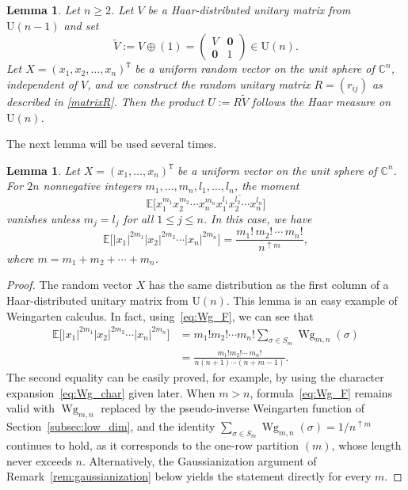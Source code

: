 \documentclass[pdftex]{sigma}
\numberwithin{equation}{section}
\newtheorem{Lemma}[Theorem]{Lemma}
\theoremstyle{definition}
\newcommand{\UU}{\mathrm{U}}
\newcommand{\trans}[1]{#1^{\mathtt{T}}}
\DeclareMathOperator{\Wg}{Wg}
\begin{document}
\begin{Lemma}
\label{lem:BNN}
Let $n \ge 2$. Let $V$ be a Haar-distributed unitary matrix from $\UU (n-1)$ and set
\begin{equation*} %
\tilde{V}:= V \oplus (1)=\begin{pmatrix} V & \bm{0} \\ \bm{0} & 1 \end {pmatrix} \in \UU(n).
\end{equation*}
Let $X=\trans{(x_1,x_2,\dots,x_n)}$ be a uniform random vector on the unit sphere of $\mathbb{C}^n$, independent of $V$,
and we construct the random unitary matrix $R=(r_{ij})$ as described in \eqref{matrixR}.
Then the product $U:=R \tilde{V}$ follows the Haar measure on $\UU (n)$.
\end{Lemma}


The next lemma will be used several times.

\begin{Lemma} \label{lem:Wg_for_R}
Let $X=\trans{(x_1,\dots,x_n)}$ be a uniform vector on the unit sphere of $\mathbb{C}^n$.
For $2n$ nonnegative integers $m_1,\dots, m_n, l_1,\dots, l_n$, the moment
\[
\mathbb{E}\bigl[x_1^{m_1} x_2^{m_2} \cdots x_n^{m_n} \overline{x_1^{l_1} x_2^{l_2} \cdots x_n^{l_n}} \bigr]
\]
 vanishes unless $m_j=l_j$ for all $1 \le j \le n$.
In this case, we have
\[
\mathbb{E} \bigl[|x_1|^{2m_1} |x_2|^{2m_2} \cdots |x_n|^{2m_n}\bigr]
= \frac{m_1! \, m_2! \, \cdots \, m_n!}{n^{\uparrow m}},
\]
where $m=m_1+ m_2+ \cdots+m_n$.
\end{Lemma}

\begin{proof}
The random vector $X$ has the same distribution as
the first column of a Haar-distributed unitary matrix from $\UU(n)$.
This lemma is an easy example of Weingarten calculus.
In fact, using~\eqref{eq:Wg_F}, we can see that
\begin{align*}
\mathbb{E} \bigl[|x_1|^{2m_1} |x_2|^{2m_2} \cdots |x_n|^{2m_n}\bigr]
&=m_1! m_2! \cdots m_n! \sum_{\sigma \in S_m} \Wg_{m,n}(\sigma) \\
&= \frac{m_1! m_2! \cdots \, m_n!}{n(n+1) \cdots (n+m-1)}.
\end{align*}
The second equality can be easily proved, for example, by using the character expansion~\eqref{eq:Wg_char} given later.
When $m > n$, formula~\eqref{eq:Wg_F} remains valid with $\Wg_{m,n}$ replaced by the pseudo-inverse Weingarten function of Section~\ref{subsec:low_dim}, and the identity $\sum_{\sigma \in S_m} \Wg_{m,n}(\sigma) = 1/n^{\uparrow m}$ continues to hold, as it corresponds to the one-row partition $(m)$, whose length never exceeds $n$. Alternatively, the Gaussianization argument of Remark~\ref{rem:gaussianization} below yields the statement directly for every $m$.
\end{proof}
\end{document}
